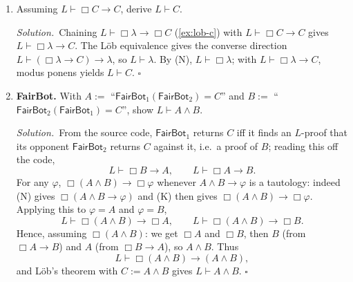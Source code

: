 \documentclass[11pt]{article}
\newcommand{\proves}{\vdash}
\newcommand{\FB}{\mathsf{FairBot}}
\newcommand{\bx}{\Box}
\newcommand{\soln}{\medskip\noindent\textit{Solution.}\ }
\renewcommand{\qed}{\ensuremath{\square}}
\begin{document}
\begin{solution}[ex:lob]
\begin{enumerate}
\item Assuming $L\proves\bx C\to C$, derive $L\proves C$.

\soln Chaining $L\proves\bx\lambda\to\bx C$ (\cref{ex:lob-c}) with $L\proves\bx C\to C$ gives $L\proves\bx\lambda\to C$. The L\"ob equivalence gives the converse direction $L\proves(\bx\lambda\to C)\to\lambda$, so $L\proves\lambda$. By (N), $L\proves\bx\lambda$; with $L\proves\bx\lambda\to C$, modus ponens yields $L\proves C$. \qed

\item \textbf{FairBot.} With $A:=$ ``$\FB_1(\FB_2)=C$'' and $B:=$ ``$\FB_2(\FB_1)=C$'', show $L\proves A\wedge B$.

\soln From the source code, $\FB_1$ returns $C$ iff it finds an $L$-proof that its opponent $\FB_2$ returns $C$ against it, i.e.\ a proof of $B$; reading this off the code,
\[
  L\proves \bx B\to A,\qquad L\proves \bx A\to B .
\]
For any $\varphi$, $\bx(A\wedge B)\to\bx\varphi$ whenever $A\wedge B\to\varphi$ is a tautology: indeed (N) gives $\bx(A\wedge B\to\varphi)$ and (K) then gives $\bx(A\wedge B)\to\bx\varphi$. Applying this to $\varphi=A$ and $\varphi=B$,
\[
  L\proves \bx(A\wedge B)\to\bx A,\qquad L\proves \bx(A\wedge B)\to\bx B.
\]
Hence, assuming $\bx(A\wedge B)$: we get $\bx A$ and $\bx B$, then $B$ (from $\bx A\to B$) and $A$ (from $\bx B\to A$), so $A\wedge B$. Thus
\[
  L\proves \bx(A\wedge B)\to(A\wedge B),
\]
and L\"ob's theorem with $C:=A\wedge B$ gives $L\proves A\wedge B$. \qed
\end{enumerate}
\end{solution}
\end{document}
